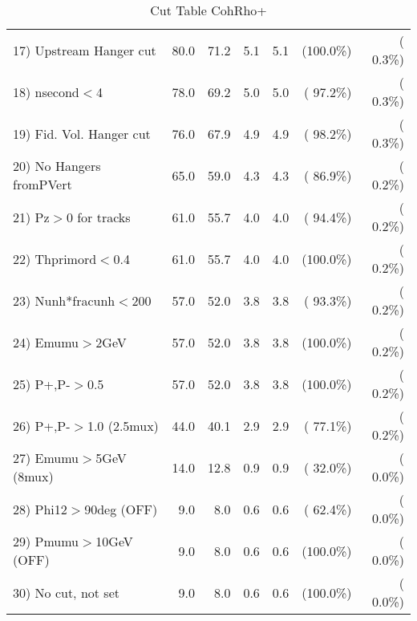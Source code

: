 \begin{table}[h!]
\begin{tabular}{||l||r|r|r|r|r|r||}
 17) Upstream Hanger cut  &         80.0 &         71.2 &          5.1 &          5.1 & (100.0\%) & (  0.3\%) \\
 18) nsecond$<$4          &         78.0 &         69.2 &          5.0 &          5.0 & ( 97.2\%) & (  0.3\%) \\
 19) Fid. Vol. Hanger cut &         76.0 &         67.9 &          4.9 &          4.9 & ( 98.2\%) & (  0.3\%) \\
 20) No Hangers fromPVert &         65.0 &         59.0 &          4.3 &          4.3 & ( 86.9\%) & (  0.2\%) \\
 21) Pz$>$0 for tracks    &         61.0 &         55.7 &          4.0 &          4.0 & ( 94.4\%) & (  0.2\%) \\
 22) Thprimord$<$0.4      &         61.0 &         55.7 &          4.0 &          4.0 & (100.0\%) & (  0.2\%) \\
 23) Nunh*fracunh$<$200   &         57.0 &         52.0 &          3.8 &          3.8 & ( 93.3\%) & (  0.2\%) \\
 24) Emumu$>$2GeV         &         57.0 &         52.0 &          3.8 &          3.8 & (100.0\%) & (  0.2\%) \\
 25) P+,P-$>$0.5          &         57.0 &         52.0 &          3.8 &          3.8 & (100.0\%) & (  0.2\%) \\
 26) P+,P-$>$1.0 (2.5mux) &         44.0 &         40.1 &          2.9 &          2.9 & ( 77.1\%) & (  0.2\%) \\
 27) Emumu$>$5GeV  (8mux) &         14.0 &         12.8 &          0.9 &          0.9 & ( 32.0\%) & (  0.0\%) \\
 28) Phi12$>$90deg  (OFF) &          9.0 &          8.0 &          0.6 &          0.6 & ( 62.4\%) & (  0.0\%) \\
 29) Pmumu$>$10GeV  (OFF) &          9.0 &          8.0 &          0.6 &          0.6 & (100.0\%) & (  0.0\%) \\
 30) No cut, not set      &          9.0 &          8.0 &          0.6 &          0.6 & (100.0\%) & (  0.0\%) \\
 \hline
 \hline
 \end{tabular}
 \caption{Cut Table  CohRho+  }
 \label{tab-cutcohjpsi-mumu_anumunc}
 \end{table}
